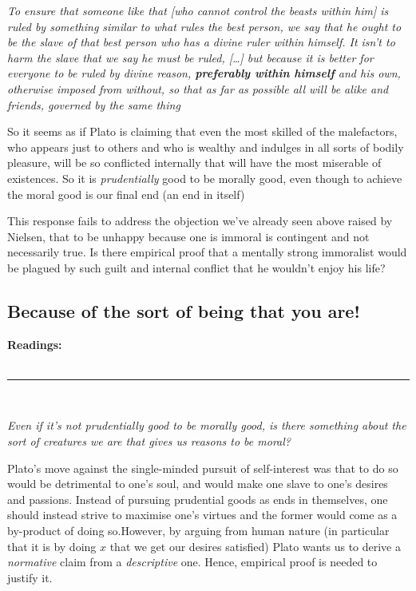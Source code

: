 \documentclass[english,course]{Notes}
\newcommand{\ita}[1]{\textit{#1}}
\newcommand\readings{\textbf{Readings:} \\}
\newcommand\sep{\\ \noindent\rule{10cm}{0.8pt} \\}
\newcommand\quo[1]{\begin{displayquote}\ita{\large{#1}}\end{displayquote}}
\begin{document}
\quo{To ensure that someone like that [who cannot control the beasts within him] is ruled by something similar to what rules the best person, we say that he ought to be the slave of that best person who has a divine ruler within himself. It isn't to harm the slave that we say he must be ruled, [\dots] but because it is better for everyone to be ruled by divine reason, \textbf{preferably within himself} and his own, otherwise imposed from without, so that as far as possible all will be alike and friends, governed by the same thing}

\par{So it seems as if Plato is claiming that even the most skilled of the malefactors, who appears just to others and who is wealthy and indulges in all sorts of bodily pleasure, will be so conflicted internally that will have the most miserable of existences. So it is \ita{prudentially} good to be morally good, even though to achieve the moral good is our final end (an end in itself)~}
\\
\par{This response fails to address the objection we've already seen above raised by Nielsen, that to be unhappy because one is immoral is contingent and not necessarily true. Is there empirical proof that a mentally strong immoralist would be plagued by such guilt and internal conflict that he wouldn't enjoy his life?}
 
\newpage
\subsection{Because of the sort of being that you are! }

\readings \cite{HypotheticalImperatives}
\sep

\quo{Even if it's not prudentially good to be morally good, is there something about the sort of creatures we are that gives us reasons to be moral? \\}

\par{Plato's move against the single-minded pursuit of self-interest was that to do so would be detrimental to one's soul, and would make one slave to one's desires and passions. Instead of pursuing prudential goods as ends in themselves, one should instead strive to maximise one's virtues and the former would come as a by-product of doing so.However, by arguing from human nature (in particular that it is by doing $x$ that we get our desires satisfied) Plato wants us to derive a \ita{normative} claim from a \ita{descriptive} one. Hence, empirical proof is needed to justify it.}
\end{document}
